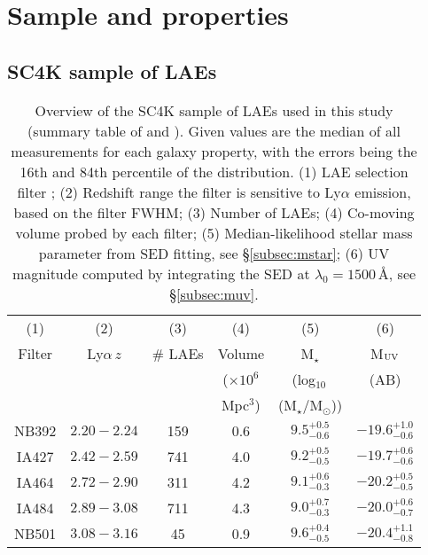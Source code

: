 \documentclass[a4paper,fleqn,usenatbib]{mnras}
\begin{document}
\section{Sample and properties} \label{sec:sample}

\subsection{SC4K sample of LAEs} \label{subsec:sample}

%
%
\begin{table}
\setlength{\tabcolsep}{2.8pt}
\begin{center}
\caption{Overview of the SC4K sample of LAEs used in this study (summary table of \citealt{Sobral2018} and \citealt{Santos2020}). Given values are the median of all measurements for each galaxy property, with the errors being the 16th and 84th percentile of the distribution. (1) LAE selection filter \citep{Sobral2018}; (2) Redshift range the filter is sensitive to Ly$\alpha$ emission, based on the filter FWHM; (3) Number of LAEs; (4) Co-moving volume probed by each filter; (5) Median-likelihood stellar mass parameter from SED fitting, see \S\ref{subsec:mstar}; (6) UV magnitude computed by integrating the SED at $\lambda_0=1500$\,{\AA}, see \S\ref{subsec:muv}.} \label{tab:overview}
\begin{tabular}{c | ccccc}
\hline
(1)& (2) & (3) & (4) & (5) & (6)\\
\multicolumn{1}{c|}{Filter} &
\multicolumn{1}{c|}{Ly$\alpha\,z$} &
\multicolumn{1}{c|}{\# LAEs} &
\multicolumn{1}{c|}{Volume} &
\multicolumn{1}{c|}{M$_\star$} &
\multicolumn{1}{c|}{M$_{\rm UV}$} \\
& & & ($\times10^6$  & (log$_{10}\,$ & (AB)\\
& & & Mpc$^3$)  & (M$_\star$/M$_{\odot}$)) & \\
\hline
NB392 & $2.20-2.24$ & 159& 0.6& $9.5^{+0.5}_{-0.6}$ & $-19.6^{+1.0}_{-0.6}$\\
IA427 & $2.42-2.59$ & 741& 4.0& $9.2^{+0.5}_{-0.5}$ & $-19.7^{+0.6}_{-0.6}$ \\
IA464 & $2.72-2.90$ & 311& 4.2&$9.1^{+0.6}_{-0.3}$ & $-20.2^{+0.5}_{-0.5}$ \\
IA484 & $2.89-3.08$ & 711& 4.3& $9.0^{+0.7}_{-0.3}$ & $-20.0^{+0.6}_{-0.7}$ \\
NB501 & $3.08-3.16$ & 45& 0.9& $9.6^{+0.4}_{-0.5}$ & $-20.4^{+1.1}_{-0.8}$ \\

\end{tabular}
\end{center}
\end{table}
\end{document}
